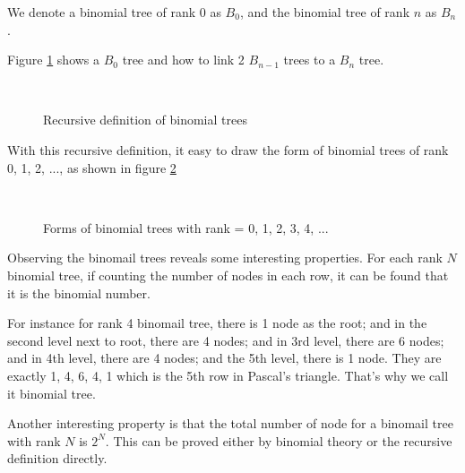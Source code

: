 \documentclass{article}
\begin{document}
We denote a binomial tree of rank 0 as $B_0$, and the binomial tree of rank
$n$ as $B_n$.

Figure \ref{fig:link-bitree} shows a $B_0$ tree and how to link 2 $B_{n-1}$
trees to a $B_n$ tree.

\begin{figure}[htbp]
  \centering
   \\
  \caption{Recursive definition of binomial trees} \label{fig:link-bitree}
\end{figure}

With this recursive definition, it easy to draw the form of binomial trees
of rank 0, 1, 2, ..., as shown in figure \ref{fig:bitree-forms}

\begin{figure}[htbp]
  \centering
   \\
  \caption{Forms of binomial trees with rank = 0, 1, 2, 3, 4, ...} \label{fig:bitree-forms}
\end{figure}

Observing the binomail trees reveals some interesting properties. For each rank $N$ binomial tree, if counting the number of nodes in each row, it can be found that it is the binomial number.

For instance for rank 4 binomail tree, there is 1 node as the root; and in the second level next to root, there are 4 nodes; and in 3rd level, there are 6 nodes; and in 4th level, there are 4 nodes; and the 5th level, there is 1 node. They are exactly 1, 4, 6, 4, 1 which is the 5th row in Pascal's triangle. That's why we call it binomial tree.

Another interesting property is that the total number of node for a binomail tree with rank $N$ is $2^N$. This can be proved either by binomial theory or the recursive definition directly.
\end{document}
